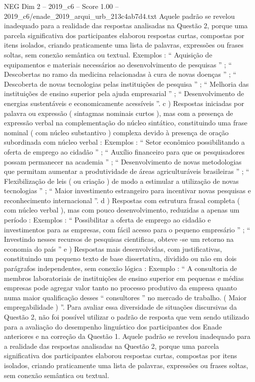 \begin{textsample}{NEG Dim 2 – 2019\_c6 – Score 1.00 – 2019\_c6/enade\_2019\_arqui\_urb\_213c4ab7d4.txt}
Aquele padrão se revelou inadequado para a realidade das respostas analisadas na Questão 2, porque uma parcela significativa dos participantes elaborou respostas curtas, compostas por itens isolados, criando praticamente uma lista de palavras, expressões ou frases soltas, sem conexão semântica ou textual.
Exemplos : “ Aquisição de equipamentos e materiais necessários ao desenvolvimento de pesquisas ” ; “ Descobertas no ramo da medicina relacionadas à cura de novas doenças ” ; “ Descoberta de novas tecnologias pelas instituições de pesquisa ” ; “ Melhoria das instituições de ensino superior pela ajuda empresarial ” ; “ Desenvolvimento de energias sustentáveis e economicamente acessíveis ”. c ) Respostas iniciadas por palavra ou expressão ( sintagmas nominais curtos ), mas com a presença de expressão verbal na complementação do núcleo sintático, constituindo uma frase nominal ( com núcleo substantivo ) complexa devido à presença de oração subordinada com núcleo verbal : Exemplos : “ Setor econômico possibilitando a oferta de emprego ao cidadão ” ; “ Auxílio financeiro para que os pesquisadores possam permanecer na academia ” ; “ Desenvolvimento de novas metodologias que permitam aumentar a produtividade de áreas agriculturáveis brasileiras ” ; “ Flexibilização de leis ( ou criação ) de modo a estimular a utilização de novas tecnologias ” ; “ Maior investimento estrangeiro para incentivar novas pesquisas e reconhecimento internacional ”. d ) Respostas com estrutura frasal completa ( com núcleo verbal ), mas com pouco desenvolvimento, reduzidas a apenas um período : Exemplos : “ Possibilitar a oferta de emprego ao cidadão e investimentos para as empresas, com fácil acesso para o pequeno empresário ” ; “ Investindo nesses recursos de pesquisas cientificas, obteve -se um retorno na economia do país ” e ) Respostas mais desenvolvidas, com justificativas, constituindo um pequeno texto de base dissertativa, dividido ou não em dois parágrafos independentes, sem conexão lógica : Exemplo : “ A consultoria de membros laboratoriais de instituições de ensino superior em pequenas e médias empresas pode agregar valor tanto no processo produtivo da empresa quanto numa maior qualificação desses “ consultores ” no mercado de trabalho. ( Maior empregabilidade ) ”.
Para avaliar essa diversidade de situações discursivas da Questão 2, não foi possível utilizar o padrão de resposta que vem sendo utilizado para a avaliação do desempenho linguístico dos participantes dos Enade anteriores e na correção da Questão 1.
Aquele padrão se revelou inadequado para a realidade das respostas analisadas na Questão 2, porque uma parcela significativa dos participantes elaborou respostas curtas, compostas por itens isolados, criando praticamente uma lista de palavras, expressões ou frases soltas, sem conexão semântica ou textual.

\end{textsample}
